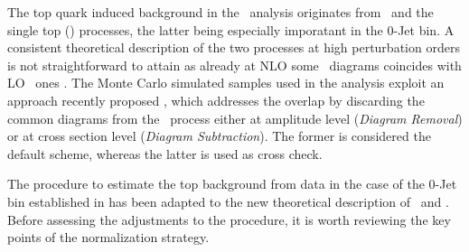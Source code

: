 The top quark induced background in the \WW\ analysis originates from
\ttbar\ and the single top (\tw) processes, the latter being especially imporatant 
in the 0-Jet bin.  A consistent theoretical description of the two
processes at high perturbation orders is not straightforward to attain
as already at NLO some \tw\ diagrams coincides with LO \ttbar\
ones \cite{singleTopInterference}.  The Monte Carlo simulated samples
used in the analysis exploit an approach recently
proposed \cite{singleTopRemoval}, which addresses the overlap by
discarding the common diagrams from the \tw\ process either at
amplitude level ({\it Diagram Removal}) or at cross section level
({\it Diagram Subtraction}).  The former is considered the default
scheme, whereas the latter is used as cross check.

The procedure to estimate the top background from data in the case of
the 0-Jet bin established in \cite{HWW2011} has been adapted to the
new theoretical description of \ttbar\ and \tw{}.  Before assessing the
adjustments to the procedure, it is worth reviewing the key points of
the normalization strategy.

